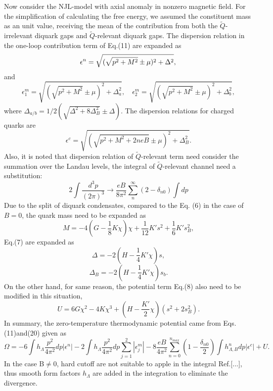 \documentclass[prd, showpacs,nofootinbib,amsmath,amssymb]{revtex4}
\begin{document}
Now consider the NJL-model with axial anomaly in nonzero magnetic field.
For the simplification of calculating the free energy, we assumed the constituent mass as an unit value, receiving the mean of the contribution from both the $\widetilde{Q}$-irrelevant diquark gaps and $\widetilde{Q}$-relevant diquark gaps.
The dispersion relation in the one-loop contribution term of Eq.(11) are expanded as
\begin{equation}
\label{eq:dispersion1}
	\epsilon^n = \sqrt{(\sqrt{p^2+M^2}\pm \mu)^2 + \Delta^2},\\
\end{equation}
and
\begin{equation}
\label{eq:dispersion2}
\epsilon^m_1 = \sqrt{(\sqrt{p^2+M^2}\pm \mu)^2 + \Delta_{a}^2},\quad
\epsilon^m_2 = \sqrt{(\sqrt{p^2+M^2}\pm \mu)^2 + \Delta_{b}^2},
\end{equation}
where $\Delta_{a/b} = 1/2( \sqrt{\Delta^2 + 8\Delta_B^2} \pm \Delta)$.
The dispersion relations for charged quarks are
\begin{equation}
\label{eq:dispersion3}
\epsilon^c = \sqrt{(\sqrt{p^2+M^2 + 2n eB} \pm \mu)^2 + \Delta_B^2}.
\end{equation}
Also, it is noted that dispersion relation of $\widetilde{Q}$-relevant term need consider the summation over the Landau levels,
the integral of $\widetilde{Q}$-relevant channel need a substitution:
\begin{equation}
2\int\frac{d^3p}{(2\pi)^3}\rightarrow\frac{eB}{8\pi^2}\sum^{\infty}_n(2-\delta_{n0})\int dp
\end{equation}
Due to the split of diquark condensates, compared to the Eq. (6) in the case of $B=0$, the quark mass need to be expanded as
\begin{equation}
M=-4(G-\frac{1}{8}K\chi)\chi+\frac{1}{12}K's^2+\frac{1}{6}K's^2_B,
\end{equation}
Eq.(7) are expanded as
\begin{equation}
\Delta=-2(H-\frac{1}{4}K'\chi)s,
\end{equation}
\begin{equation}
\Delta_B=-2(H-\frac{1}{4}K'\chi)s_b.
\end{equation}
On the other hand, for same reason, the potential term Eq.(8) also need to be modified in this situation,
\begin{equation}
U=6G\chi^2-4K\chi^3+(H-\frac{K'}{2}\chi)(s^2+2s^2_B).
\end{equation}
In summary, the zero-temperature thermodynamic potential came from Eqs.(11)and(20) given as
\begin{equation}
\label{eq:bfreegy}
\Omega = -6\int h_{\Lambda} \frac{p^2}{4\pi^2} dp
|\epsilon^n|
-2\int h_{\Lambda} \frac{p^2}{4\pi^2} dp
\sum_{j=1}^2 |\epsilon_j^m|
-8\frac{eB}{4\pi^2}\sum_{n=0}^{n_{max}} (1 -\frac{\delta_{n0}}{2}) \int h^n_{\Lambda,B}dp|\epsilon^c|
+ U.
\end{equation}
In the case B$\neq$0, hard cutoff are not suitable to apple in the integral Ref.[...],
thus smooth form factors $h_\Lambda$ are added in the integration to eliminate the divergence.
\end{document}
